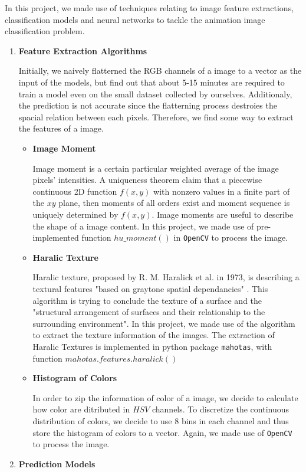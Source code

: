 \documentclass[11.5pt]{article}
\begin{document}
    In this project, we made use of techniques relating to image feature extractions, classification models and neural networks to tackle the animation image classification problem.

    \begin{enumerate}
        \item \textbf{Feature Extraction Algorithms}

        Initially, we naively flatterned the RGB channels of a image to a vector as the input of the models, but find out that about 5-15 minutes are required to train a model even on the small dataset collected by ourselves. Additionaly, the prediction is not accurate since the flatterning process destroies the spacial relation between each pixels. Therefore, we find some way to extract the features of a image.
        \begin{itemize}
            \item \textbf{Image Moment}

            Image moment is a certain particular weighted average of the image pixels' intensities. A uniqueness theorem \cite{img_moment} claim that a piecewise continuous 2D function $f(x,y)$ with nonzero values in a finite part of the $xy$ plane, then moments of all orders exist and moment sequence is uniquely determined by $f(x,y)$. Image moments are useful to describe the shape of a image content. In this project, we made use of pre-implemented function $hu\_moment()$ in \texttt{OpenCV}\cite{opencv_library} to process the image.
            \item \textbf{Haralic Texture}

            Haralic texture, proposed by R. M. Haralick et al. in 1973, is describing a textural features "based on graytone spatial dependancies" \cite{haralick}. This algorithm is trying to conclude the texture of a surface and the "structural arrangement of surfaces and their relationship to the surrounding environment"\cite{haralick}. In this project, we made use of the algorithm to extract the texture information of the images. The extraction of Haralic Textures is implemented in python package \texttt{mahotas}\cite{mahotas}, with function $mahotas.features.haralick()$
            \item \textbf{Histogram of Colors}

            In order to zip the information of color of a image, we decide to calculate how color are ditributed in $HSV$ channels. To discretize the continuous distribution of colors, we decide to use 8 bins in each channel and thus store the histogram of colors to a vector. Again, we made use of \texttt{OpenCV}\cite{opencv_library} to process the image.
        \end{itemize}
        \item \textbf{Prediction Models}


\end{enumerate}
\end{document}
